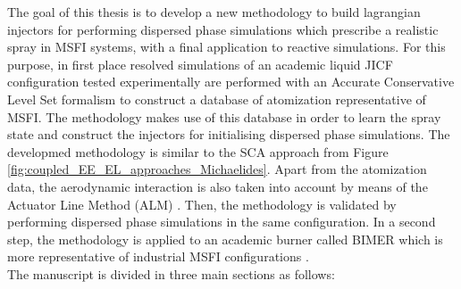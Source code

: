     
The goal of this thesis is to develop a new methodology to build lagrangian injectors for performing dispersed phase simulations which prescribe a realistic spray in MSFI systems, with a final application to reactive simulations. For this purpose, in first place resolved simulations of an academic liquid JICF configuration tested experimentally  are performed with an Accurate Conservative Level Set formalism  to construct a database of atomization representative of MSFI. The methodology makes use of this database in order to learn the spray state and construct the injectors for initialising dispersed phase simulations. The developmed methodology is similar to the SCA approach from Figure \ref{fig:coupled_EE_EL_approaches_Michaelides}. Apart from the atomization data, the aerodynamic interaction is also taken into account by means of the Actuator Line Method (ALM) . Then, the methodology is validated by performing dispersed phase simulations in the same configuration. In a second step, the methodology is applied to an academic burner called BIMER which is more representative of industrial MSFI configurations . \\


The manuscript is divided in three main sections as follows:

